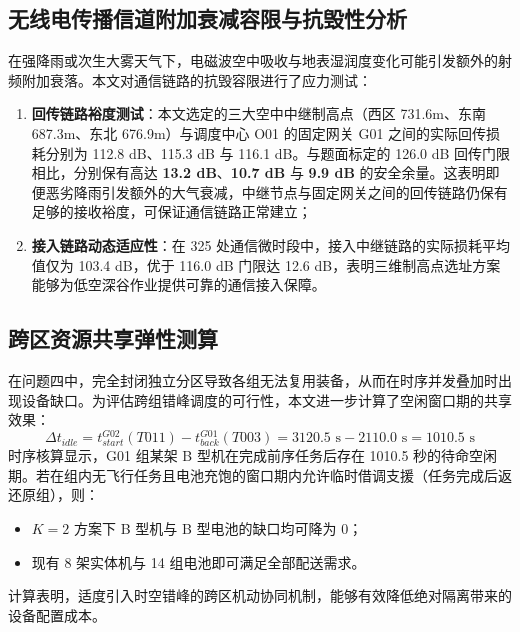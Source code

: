 \subsection{无线电传播信道附加衰减容限与抗毁性分析}

在强降雨或次生大雾天气下，电磁波空中吸收与地表湿润度变化可能引发额外的射频附加衰落。本文对通信链路的抗毁容限进行了应力测试：
\begin{enumerate}
    \item \textbf{回传链路裕度测试}：本文选定的三大空中中继制高点（西区 731.6m、东南 687.3m、东北 676.9m）与调度中心 O01 的固定网关 G01 之间的实际回传损耗分别为 112.8 dB、115.3 dB 与 116.1 dB。与题面标定的 126.0 dB 回传门限相比，分别保有高达 \textbf{13.2 dB}、\textbf{10.7 dB} 与 \textbf{9.9 dB} 的安全余量。这表明即便恶劣降雨引发额外的大气衰减，中继节点与固定网关之间的回传链路仍保有足够的接收裕度，可保证通信链路正常建立；
    \item \textbf{接入链路动态适应性}：在 325 处通信微时段中，接入中继链路的实际损耗平均值仅为 103.4 dB，优于 116.0 dB 门限达 12.6 dB，表明三维制高点选址方案能够为低空深谷作业提供可靠的通信接入保障。
\end{enumerate}

\subsection{跨区资源共享弹性测算}

在问题四中，完全封闭独立分区导致各组无法复用装备，从而在时序并发叠加时出现设备缺口。为评估跨组错峰调度的可行性，本文进一步计算了空闲窗口期的共享效果：
\begin{equation}
    \Delta t_{idle} = t_{start}^{G02}(T011) - t_{back}^{G01}(T003) = 3120.5\text{ s} - 2110.0\text{ s} = 1010.5\text{ s}
\end{equation}
时序核算显示，G01 组某架 B 型机在完成前序任务后存在 1010.5 秒的待命空闲期。若在组内无飞行任务且电池充饱的窗口期内允许临时借调支援（任务完成后返还原组），则：
\begin{itemize}
    \item $K=2$ 方案下 B 型机与 B 型电池的缺口均可降为 0；
    \item 现有 8 架实体机与 14 组电池即可满足全部配送需求。
\end{itemize}
计算表明，适度引入时空错峰的跨区机动协同机制，能够有效降低绝对隔离带来的设备配置成本。
